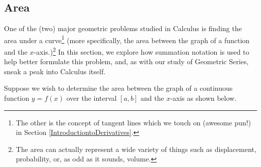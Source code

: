 \documentclass{ximera}
\begin{document}
\subsection{Area}
\label{AreabySum}

One of the (two) major geometric problems studied in Calculus is finding the area under a curve\footnote{The other is the concept of tangent lines which we touch on (awesome pun!) in Section \ref{IntroductiontoDerivatives}.}  (more specifically, the area between the graph of a function and the $x$-axis.)\footnote{The area can actually represent a wide variety of things such as displacement, probability, or, as odd as it sounds, volume.}  In this section, we explore how summation notation is used to help better formulate this problem, and, as with our study of Geometric Series, sneak a peak into Calculus itself.

\medskip

Suppose we wish to determine the area between the graph of a continuous function $y = f(x)$  over the interval  $[a,b]$ and the $x$-axis as shown below.  
\end{document}
